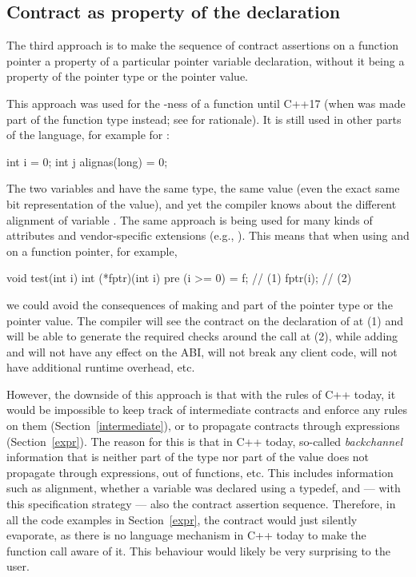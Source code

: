 
\subsection{Contract as property of the declaration}
\label{decl}

The third approach is to make the sequence of contract assertions on a function pointer a property of a particular pointer variable declaration, without it being a property of the pointer type or the pointer value.

This approach was used for the -ness of a function until C++17 (when  was made part of the function type instead; see \cite{P0012R1} for rationale). It is still used in other parts of the language, for example for :
\begin{codeblock}
int i = 0;
int j alignas(long) = 0;
\end{codeblock}
The two variables  and  have the same type, the same value (even the exact same bit representation of the value), and yet the compiler knows about the different alignment of variable . The same approach is being used for many kinds of attributes and vendor-specific extensions (e.g., ). This means that when using   and  on a function pointer, for example,
\begin{codeblock}
void test(int i) {
  int (*fptr)(int i) pre (i >= 0) = f;  // (1)
  fptr(i);  // (2)
}
\end{codeblock}
we could avoid the consequences of making   and  part of the pointer type or the pointer value. The compiler will see the contract on the declaration of  at (1) and will be able to generate the required checks around the call at (2), while adding  and  will not have any effect on the ABI, will not break any client code, will not have additional runtime overhead, etc.

However, the downside of this approach is that with the rules of C++ today, it would be impossible to keep track of intermediate contracts and enforce any rules on them (Section~\ref{intermediate}), or to propagate contracts through expressions (Section~\ref{expr}). The reason for this is that in C++ today, so-called \emph{backchannel} information that is neither part of the type nor part of the value does not propagate through expressions, out of functions, etc. This includes information such as alignment, whether a variable was declared using a typedef, and --- with this specification strategy --- also the contract assertion sequence. Therefore, in all the code examples in Section~\ref{expr}, the contract would just silently evaporate, as there is no language mechanism in C++ today to make the function call aware of it. This behaviour would likely be very surprising to the user.

